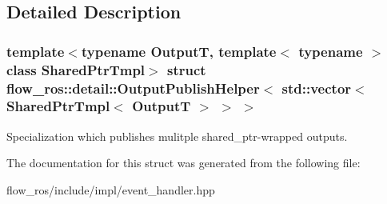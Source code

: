\subsection{Detailed Description}
\subsubsection*{template$<$typename OutputT, template$<$ typename $>$ class Shared\+Ptr\+Tmpl$>$\newline
struct flow\+\_\+ros\+::detail\+::\+Output\+Publish\+Helper$<$ std\+::vector$<$ Shared\+Ptr\+Tmpl$<$ Output\+T $>$ $>$ $>$}

Specialization which publishes mulitple shared\+\_\+ptr-\/wrapped outputs. 

The documentation for this struct was generated from the following file\+:\begin{DoxyCompactItemize}
\item 
flow\+\_\+ros/include/impl/event\+\_\+handler.\+hpp\end{DoxyCompactItemize}
